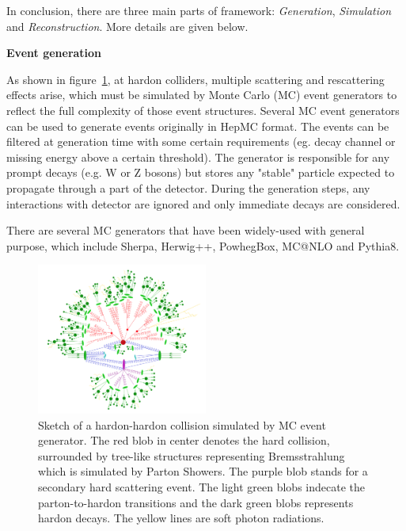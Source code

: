 In conclusion, there are three main parts of framework: \textit{Generation}, \textit{Simulation} and \textit{Reconstruction}. 
More details are given below.

\textbf{Event generation}

As shown in figure~\ref{fig:mc_event_structure}\cite{Hoche:2014rga}, at hardon colliders, multiple scattering and rescattering effects arise, which must be simulated by Monte Carlo (MC) event generators to reflect the full complexity of those event structures.
Several MC event generators can be used to generate events originally in HepMC format.
The events can be filtered at generation time with some certain requirements (eg. decay channel or missing energy above a certain threshold).
The generator is responsible for any prompt decays (e.g. W or Z bosons) but stores any "stable" particle expected to propagate through a part of the detector. 
During the generation steps, any interactions with detector are ignored and only immediate decays are considered.

There are several MC generators that have been widely-used with general purpose, which include Sherpa\cite{Gleisberg_2009}, Herwig++\cite{Bahr2008}, PowhegBox\cite{Nason:2004rx}, MC@NLO\cite{Frixione_2002} and Pythia8\cite{Sjostrand:2007gs}.

\begin{figure}[!htb]
  \centering
  \includegraphics[width=0.5\textwidth]{figures/Simulation/mc_event_structure.png}
  \caption{Sketch of a hardon-hardon collision simulated by MC event generator. The red blob in center denotes the hard collision, surrounded by tree-like structures representing Bremsstrahlung which is simulated by Parton Showers. The purple blob stands for a secondary hard scattering event. The light green blobs indecate the parton-to-hardon transitions and the dark green blobs represents hardon decays. The yellow lines are soft photon radiations.}
  \label{fig:mc_event_structure}
\end{figure}

